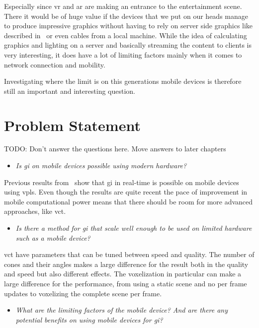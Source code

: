 Especially since \gls{vr} and \gls{ar} are making an entrance to the entertainment scene.
There it would be of huge value if the devices that we put on our heads manage to produce impressive graphics without having to rely on server side graphics like described in~\cite{cloudlight} or even cables from a local machine. 
While the idea of calculating graphics and lighting on a server and basically streaming the content to clients is very interesting, it does have a lot of limiting factors mainly when it comes to network connection and mobility.

Investigating where the limit is on this generations mobile devices is therefore still an important and interesting question.

\section{Problem Statement}

TODO: Don't answer the questions here. Move answers to later chapters

\begin{itemize}
  \item \textit{Is \acrlong{gi} on mobile devices possible using modern hardware?}
\end{itemize}

Previous results from~\cite{gimobile} show that \gls{gi} in real-time is possible on mobile devices using \glspl{vpl}. 
Even though the results are quite recent the pace of improvement in mobile computational power means that there should be room for more advanced approaches, like \gls{vct}.

\begin{itemize}
  \item \textit{Is there a method for \acrlong{gi} that scale well enough to be used on limited hardware such as a mobile device?}
\end{itemize}

\gls{vct} have parameters that can be tuned between speed and quality. 
The number of cones and their angles makes a large difference for the result both in the quality and speed but also different effects. 
The voxelization in particular can make a large difference for the performance, from using a static scene and no per frame updates to voxelizing the complete scene per frame.

\begin{itemize}
  \item \textit{What are the limiting factors of the mobile device? And are there any potential benefits on using mobile devices for \gls{gi}?}
\end{itemize}

